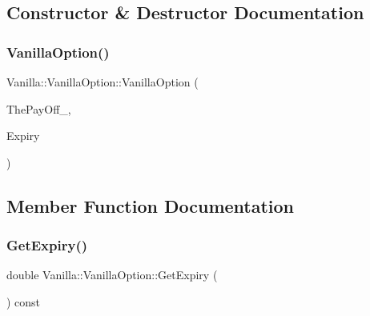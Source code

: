 \subsection{Constructor \& Destructor Documentation}
\hypertarget{classVanilla_1_1VanillaOption_a8e282ec5b974f93f9e4c5e13d6b5b4f5}{}\label{classVanilla_1_1VanillaOption_a8e282ec5b974f93f9e4c5e13d6b5b4f5} 
\subsubsection{\texorpdfstring{Vanilla\+Option()}{VanillaOption()}}
{\footnotesize\ttfamily Vanilla\+::\+Vanilla\+Option\+::\+Vanilla\+Option (\begin{DoxyParamCaption}\item[{const \hyperlink{classPayOffBridge}{Pay\+Off\+Bridge} \&}]{The\+Pay\+Off\+\_\+,  }\item[{double}]{Expiry }\end{DoxyParamCaption})}



\subsection{Member Function Documentation}
\hypertarget{classVanilla_1_1VanillaOption_a44567e6d20a534387d82e81e52ed5f8d}{}\label{classVanilla_1_1VanillaOption_a44567e6d20a534387d82e81e52ed5f8d} 
\subsubsection{\texorpdfstring{Get\+Expiry()}{GetExpiry()}}
{\footnotesize\ttfamily double Vanilla\+::\+Vanilla\+Option\+::\+Get\+Expiry (\begin{DoxyParamCaption}{ }\end{DoxyParamCaption}) const}

\hypertarget{classVanilla_1_1VanillaOption_a04d12609adfccf000de7a3fe16d58b13}{}\label{classVanilla_1_1VanillaOption_a04d12609adfccf000de7a3fe16d58b13} 
